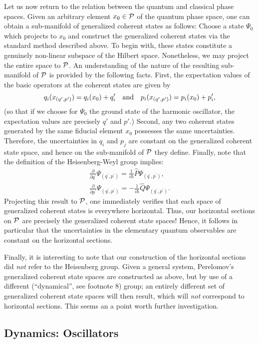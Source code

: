 \documentclass[12pt,aps,eqsecnum,tighten,nofootinbib]{revtex4-2}
\def\be{\begin{equation}}
\def\ee{\end{equation}}
\def\ba{\begin{eqnarray}}
\def\ea{\end{eqnarray}}
\def\i{{i}}
\def\P{{\cal P}}
\begin{document}
Let us now return to the relation between the quantum and classical
phase spaces. Given an arbitrary element $x_0 \in \P$ of the quantum
phase space, one can obtain a sub-manifold of generalized coherent
states as follows: Choose a state $\Psi_0$ which projects to $x_0$ and
construct the generalized coherent states via the standard method
described above. To begin with, these states constitute a genuinely
non-linear subspace of the Hilbert space. Nonetheless, we may project
the entire space to $\P$. An understanding of the nature of the
resulting sub-manifold of $\P$ is provided by the following
facts. First, the expectation values of the basic operators at the
coherent states are given by
%
\be
  q_i( x_{(q^\prime, p^\prime)} ) = q_i( x_0 ) + q^\prime_i
	\quad {\rm and} \quad
  p_i( x_{(q^\prime, p^\prime)} ) = p_i( x_0 ) + p^\prime_i,
\ee
%
(so that if we choose for $\Psi_0$ the ground state of the harmonic
oscillator, the expectation values are precisely $q'$ and $p'$.)
Second, any two coherent states generated by the same fiducial element
$x_0$ possesses the same uncertainties. Therefore, the uncertainties
in $q_i$ and $p_j$ are constant on the generalized coherent state
space, and hence on the sub-manifold of $\P$ they define. Finally, 
note that the definition of the Heisenberg-Weyl group
implies:
%
\ba \frac{\partial}{\partial q^\prime}
\Psi_{(q^\prime, p^\prime)} = \frac{1}{\i\hbar} \hat{P}
\Psi_{(q^\prime, p^\prime)}, \\ \frac{\partial}{\partial p^\prime}
\Psi_{(q^\prime, p^\prime)} = - \frac{1}{\i\hbar} \hat{Q}
\Psi_{(q^\prime, p^\prime)}.  
\ea 
%
Projecting this result to $\P$, one immediately verifies that each
space of generalized coherent states is everywhere horizontal. Thus,
our horizontal sections on $\P$ are precisely the generalized coherent
state spaces! Hence, it follows in particular that the uncertainties
in the elementary quantum observables are constant on the horizontal
sections.

Finally, it is interesting to note that our construction of the
horizontal sections did {\em not} refer to the Heisenberg group.
Given a general system, Perelomov's generalized coherent state spaces
are constructed as above, but by use of a different (``dynamical'',
see footnote 8) group; an entirely different set of
generalized coherent state spaces will then result, which will {\em
not} correspond to horizontal sections.  This seems an a point worth
further investigation.


\subsection{Dynamics: Oscillators} \label{sec4.B}
\end{document}

